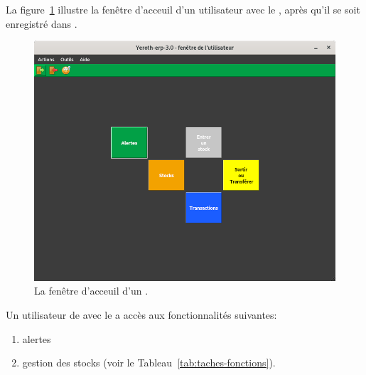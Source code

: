 \label{sec:utilisateurs-lemagasinier}

La figure~\ref{fig:yeren-fenetre-magasinier} illustre
la fen\^etre d'acceuil d'un utilisateur avec le
\role \magasinier, apr\`es qu'il se soit enregistr\'e
dans \yeren.\\

\begin{figure}[!htbp]
\centering
\includegraphics[scale=0.63]{images/yeren-fenetre-magasinier.png}
\caption{La fen\^etre d'acceuil d'un \magasinier.}
\label{fig:yeren-fenetre-magasinier}
\end{figure}

Un utilisateur de \yeren avec le \role \magasinier a acc\`es
aux fonctionnalit\'es suivantes:
\begin{enumerate}[1)]
	\item alertes
	\item gestion des stocks (voir le Tableau~\ref{tab:taches-fonctions}).\\
\end{enumerate}
